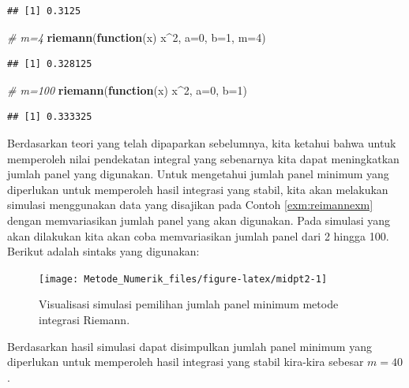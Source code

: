 \documentclass[]{book}
\newenvironment{Shaded}{\begin{snugshade}}{\end{snugshade}}
\newcommand{\CommentTok}[1]{\textcolor[rgb]{0.56,0.35,0.01}{\textit{#1}}}
\newcommand{\ControlFlowTok}[1]{\textcolor[rgb]{0.13,0.29,0.53}{\textbf{#1}}}
\newcommand{\DataTypeTok}[1]{\textcolor[rgb]{0.13,0.29,0.53}{#1}}
\newcommand{\DecValTok}[1]{\textcolor[rgb]{0.00,0.00,0.81}{#1}}
\newcommand{\KeywordTok}[1]{\textcolor[rgb]{0.13,0.29,0.53}{\textbf{#1}}}
\newcommand{\NormalTok}[1]{#1}
\newcommand{\OperatorTok}[1]{\textcolor[rgb]{0.81,0.36,0.00}{\textbf{#1}}}
\theoremstyle{definition}
\theoremstyle{definition}
\theoremstyle{definition}
\theoremstyle{remark}
\begin{document}
\begin{verbatim}
## [1] 0.3125
\end{verbatim}

\begin{Shaded}
\begin{Highlighting}[]
\CommentTok{# m=4}
\KeywordTok{riemann}\NormalTok{(}\ControlFlowTok{function}\NormalTok{(x) x}\OperatorTok{^}\DecValTok{2}\NormalTok{, }\DataTypeTok{a=}\DecValTok{0}\NormalTok{, }\DataTypeTok{b=}\DecValTok{1}\NormalTok{, }\DataTypeTok{m=}\DecValTok{4}\NormalTok{)}
\end{Highlighting}
\end{Shaded}

\begin{verbatim}
## [1] 0.328125
\end{verbatim}

\begin{Shaded}
\begin{Highlighting}[]
\CommentTok{# m=100}
\KeywordTok{riemann}\NormalTok{(}\ControlFlowTok{function}\NormalTok{(x) x}\OperatorTok{^}\DecValTok{2}\NormalTok{, }\DataTypeTok{a=}\DecValTok{0}\NormalTok{, }\DataTypeTok{b=}\DecValTok{1}\NormalTok{)}
\end{Highlighting}
\end{Shaded}

\begin{verbatim}
## [1] 0.333325
\end{verbatim}

Berdasarkan teori yang telah dipaparkan sebelumnya, kita ketahui bahwa untuk memperoleh nilai pendekatan integral yang sebenarnya kita dapat meningkatkan jumlah panel yang digunakan. Untuk mengetahui jumlah panel minimum yang diperlukan untuk memperoleh hasil integrasi yang stabil, kita akan melakukan simulasi menggunakan data yang disajikan pada Contoh \ref{exm:reimannexm} dengan memvariasikan jumlah panel yang akan digunakan. Pada simulasi yang akan dilakukan kita akan coba memvariasikan jumlah panel dari 2 hingga 100. Berikut adalah sintaks yang digunakan:

\begin{figure}

{\centering \texttt{[image: Metode\_Numerik\_files/figure-latex/midpt2-1]} 

}

\caption{Visualisasi simulasi pemilihan jumlah panel minimum metode integrasi Riemann.}\label{fig:midpt2}
\end{figure}

Berdasarkan hasil simulasi dapat disimpulkan jumlah panel minimum yang diperlukan untuk memperoleh hasil integrasi yang stabil kira-kira sebesar \(m=40\).
\end{document}
